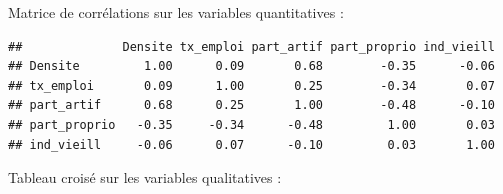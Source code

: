 \documentclass[]{book}
\newenvironment{Shaded}{\begin{snugshade}}{\end{snugshade}}
\newcommand{\DataTypeTok}[1]{\textcolor[rgb]{0.13,0.29,0.53}{#1}}
\newcommand{\DecValTok}[1]{\textcolor[rgb]{0.00,0.00,0.81}{#1}}
\newcommand{\KeywordTok}[1]{\textcolor[rgb]{0.13,0.29,0.53}{\textbf{#1}}}
\newcommand{\NormalTok}[1]{#1}
\newcommand{\OperatorTok}[1]{\textcolor[rgb]{0.81,0.36,0.00}{\textbf{#1}}}
\newcommand{\StringTok}[1]{\textcolor[rgb]{0.31,0.60,0.02}{#1}}
\begin{document}
\begin{Shaded}
\end{Shaded}

Matrice de corrélations sur les variables quantitatives :

\begin{Shaded}
\end{Shaded}

\begin{verbatim}
##              Densite tx_emploi part_artif part_proprio ind_vieill
## Densite         1.00      0.09       0.68        -0.35      -0.06
## tx_emploi       0.09      1.00       0.25        -0.34       0.07
## part_artif      0.68      0.25       1.00        -0.48      -0.10
## part_proprio   -0.35     -0.34      -0.48         1.00       0.03
## ind_vieill     -0.06      0.07      -0.10         0.03       1.00
\end{verbatim}

Tableau croisé sur les variables qualitatives :

\begin{Shaded}
\end{Shaded}
\end{document}
